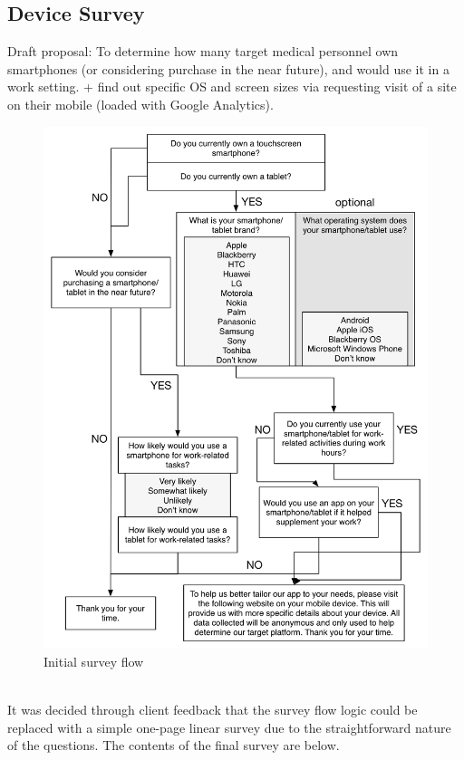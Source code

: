 \documentclass[12pt,a4paper,oneside,titlepage]{article}
\begin{document}
\newpage
\subsection{Device Survey}
Draft proposal: To determine how many target medical personnel own smartphones (or considering purchase in the near future), and would use it in a work setting. + find out specific OS and screen sizes via requesting visit of a site on their mobile (loaded with Google Analytics). 
\begin{figure}[h!]
\centering
\includegraphics[scale=0.53]{img/device-survey.png}
\caption{Initial survey flow}
\end{figure}
\\
It was decided through client feedback that the survey flow logic could be replaced with a simple one-page linear survey due to the straightforward nature of the questions. The contents of the final survey are below.
\end{document}
